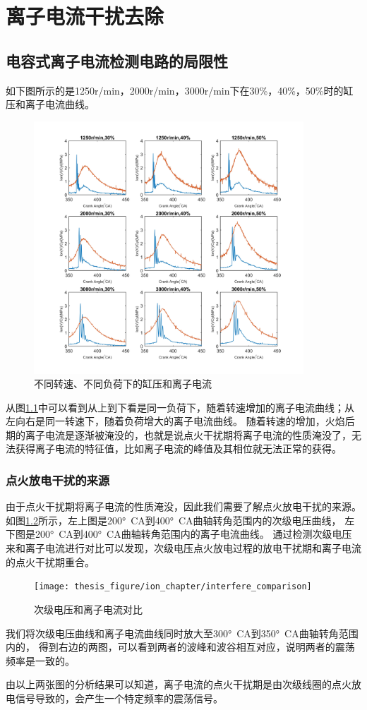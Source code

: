\chapter{离子电流干扰去除}
\section{电容式离子电流检测电路的局限性}
如下图所示的是1250r/min，2000r/min，3000r/min下在30\%，40\%，50\%时的缸压和离子电流曲线。\par
\begin{figure}[H]
	\centering
	\includegraphics[width=0.9\textwidth, trim = 1cm 0.5cm 1cm 0.75cm,clip]{thesis_figure/ion_chapter/ion_vary_trending}
	\caption{不同转速、不同负荷下的缸压和离子电流}
	\label{fig:ion_cyp}
\end{figure}
从图\ref{fig:ion_cyp}中可以看到从上到下看是同一负荷下，随着转速增加的离子电流曲线；从左向右是同一转速下，随着负荷增大的离子电流曲线。
随着转速的增加，火焰后期的离子电流是逐渐被淹没的，也就是说点火干扰期将离子电流的性质淹没了，无法获得离子电流的特征值，比如离子电流的峰值及其相位就无法正常的获得。
\subsection{点火放电干扰的来源}
由于点火干扰期将离子电流的性质淹没，因此我们需要了解点火放电干扰的来源。如图\ref{fig:itf_rs}所示，左上图是200\si{\degree CA}到400\si{\degree CA}曲轴转角范围内的次级电压曲线，
左下图是200\si{\degree CA}到400\si{\degree CA}曲轴转角范围内的离子电流曲线。
通过检测次级电压来和离子电流进行对比可以发现，次级电压点火放电过程的放电干扰期和离子电流的点火干扰期重合。\par
\begin{figure}[H]
	\centering
	\texttt{[image: thesis\_figure/ion\_chapter/interfere\_comparison]}
	\caption{\label{fig:itf_rs}次级电压和离子电流对比}
\end{figure}
我们将次级电压曲线和离子电流曲线同时放大至300\si{\degree CA}到350\si{\degree CA}曲轴转角范围内的，
得到右边的两图，可以看到两者的波峰和波谷相互对应，说明两者的震荡频率是一致的。\par
由以上两张图的分析结果可以知道，离子电流的点火干扰期是由次级线圈的点火放电信号导致的，会产生一个特定频率的震荡信号。
